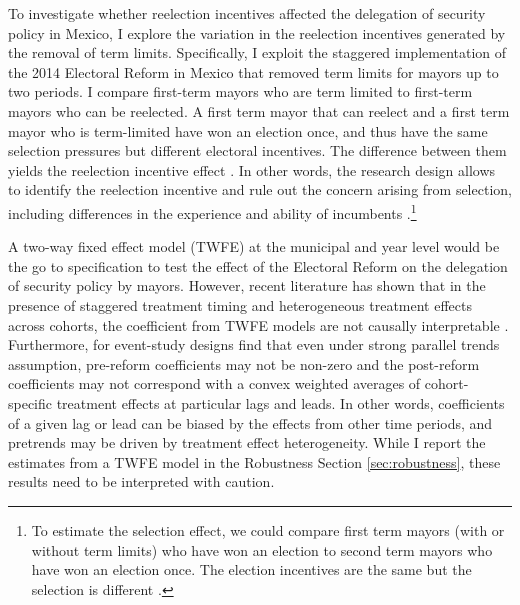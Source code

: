 \documentclass[12pt]{amsart}
\numberwithin{equation}{section}
\theoremstyle{definition}
\theoremstyle{definition}
\theoremstyle{definition}
\begin{document}
To investigate whether reelection incentives affected the delegation of security policy in Mexico, I explore the variation in the reelection incentives generated by the removal of term limits.  Specifically, I exploit the staggered implementation of the 2014 Electoral Reform in Mexico that removed term limits for mayors up to two periods. I compare first-term mayors who are term limited to first-term mayors who can be reelected. A first term mayor that can reelect and a first term mayor who is term-limited have won an election once, and thus have the same selection pressures but different electoral incentives. The difference between them yields the reelection incentive effect \citep{Besley_case_1995, ashworth_2012}. In other words, the research design allows to identify the reelection incentive and rule out the concern arising from selection, including differences in the experience and ability of incumbents \citep{ferraz_finan_2011}.\footnote{To estimate the selection effect, we could compare first term mayors (with or without term limits) who have won an election to second term mayors who have won an election once. The election incentives are the same but the selection is different \citep{ashworth_2012}.} 

A two-way fixed effect model (TWFE) at the municipal and year level would be the go to specification to test the effect of the Electoral Reform on the delegation of security policy by mayors. However, recent literature has shown that in the presence of staggered treatment timing and heterogeneous treatment effects across cohorts, the coefficient from TWFE models are not causally interpretable \citep{goodman_bacon_2018, callaway_santana_2019, strezhnev_2018, chaisemarting_etal_2019}. Furthermore, for event-study designs \citet{abraham_sun_2020} find that even under strong parallel trends assumption, pre-reform coefficients may not be non-zero and the post-reform coefficients may not correspond with a convex weighted averages of cohort-specific treatment effects at particular lags and leads. In other words, coefficients of a given lag or lead can be biased by the effects from other time periods, and pretrends may be driven by treatment effect heterogeneity. While I report the estimates from a TWFE model in the Robustness Section \ref{sec:robustness}, these results need to be interpreted with caution.
   
\end{document}
